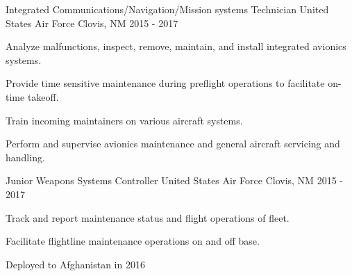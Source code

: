 

\begin{cventries}

  \cventry
    {Integrated Communications/Navigation/Mission systems Technician} %
    {United States Air Force} %
    {Clovis, NM} %
    {2015 - 2017} %
   {
      \begin{cvitems} %
         \item{Analyze malfunctions, inspect, remove, maintain, and install integrated avionics systems.}
         \item{Provide time sensitive maintenance during preflight operations to facilitate on-time takeoff.}
         \item{Train incoming maintainers on various aircraft systems.}
         \item{Perform and supervise avionics maintenance and general aircraft servicing and handling.}
      \end{cvitems}
    }

  \cventry
    {Junior Weapons Systems Controller} %
    {United States Air Force} %
    {Clovis, NM} %
    {2015 - 2017} %
   {
      \begin{cvitems} %
         \item{Track and report maintenance status and flight operations of fleet.}
         \item{Facilitate flightline maintenance operations on and off base.}
         \item{Deployed to Afghanistan in 2016}
      \end{cvitems}
    }


\end{cventries}
